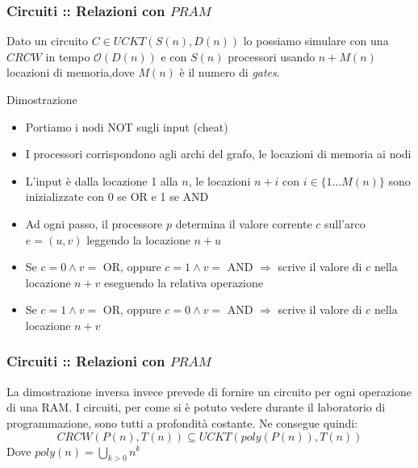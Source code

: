 \documentclass{beamer}
\newcommand{\bigO}{\ensuremath{\mathcal{O}}} %
\begin{document}
\begin{frame}
	\frametitle{Circuiti :: Relazioni con $PRAM$} %
	Dato un circuito $C \in UCKT(S(n),D(n))$ lo possiamo simulare con una $CRCW$ in tempo $\bigO{(D(n))}$ e con $S(n)$ processori usando $n + M(n)$ locazioni di memoria,dove $M(n)$ è il numero di \emph{gates}.
	\begin{block}{Dimostrazione}
		\begin{itemize}
			\item Portiamo i nodi NOT sugli input (cheat)
			\item I processori corrispondono agli archi del grafo, le locazioni di memoria ai nodi
			\item L'input è dalla locazione 1 alla $n$, le locazioni $n+i$ con $i\in\{1\dots M(n)\}$ sono inizializzate con 0 se OR e 1 se AND
			\item Ad ogni passo, il processore $p$ determina il valore corrente $c$ sull'arco $e=(u,v)$ leggendo la locazione $n+u$
			\item Se $c=0 \wedge v=$  OR, oppure $c=1 \wedge v=$ AND $\Longrightarrow$ scrive il valore di $c$ nella locazione $n+v$ eseguendo la relativa operazione
			\item Se $c=1 \wedge v=$  OR, oppure $c=0 \wedge v=$ AND $\Longrightarrow$ scrive il valore di $c$ nella locazione $n+v$
		\end{itemize}
	\end{block}
\end{frame}

\begin{frame}
	\frametitle{Circuiti :: Relazioni con $PRAM$} %
	La dimostrazione inversa invece prevede di fornire un circuito per ogni operazione di una RAM.
	I circuiti, per come si è potuto vedere durante il laboratorio di programmazione, sono tutti a profondità costante.
	Ne consegue quindi:
	\begin{equation}
		CRCW(P(n),T(n)) \subseteq UCKT(poly(P(n)), T(n))
	\end{equation}
	Dove $poly(n) = \bigcup_{k>0} n^k$
\end{frame}
\end{document}

